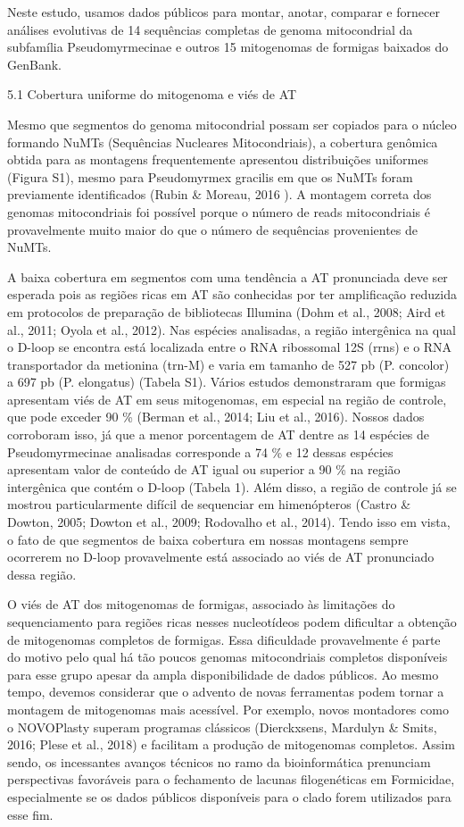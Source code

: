 \documentclass[../DISSERTACAO_MAIN.tex]{subfiles}
\begin{document}
	
	Neste estudo, usamos dados públicos para montar, anotar, comparar e fornecer análises evolutivas de 14 sequências completas de genoma mitocondrial da subfamília Pseudomyrmecinae e outros 15 mitogenomas de formigas baixados do GenBank.
	
	5.1 Cobertura uniforme do mitogenoma e viés de AT
	
	Mesmo que segmentos do genoma mitocondrial possam ser copiados para o núcleo formando NuMTs (Sequências Nucleares Mitocondriais), a cobertura genômica obtida para as montagens frequentemente apresentou distribuições uniformes (Figura S1), mesmo para Pseudomyrmex gracilis em que os NuMTs foram previamente identificados (Rubin \& Moreau, 2016 ). A montagem correta dos genomas mitocondriais foi possível porque o número de reads mitocondriais é provavelmente muito maior do que o número de sequências provenientes de NuMTs.
	
	A baixa cobertura em segmentos com uma tendência a AT pronunciada deve ser esperada pois as regiões ricas em AT são conhecidas por ter amplificação reduzida em protocolos de preparação de bibliotecas Illumina (Dohm et al., 2008; Aird et al., 2011; Oyola et al., 2012). Nas espécies analisadas, a região intergênica na qual o D-loop se encontra está localizada entre o RNA ribossomal 12S (rrns) e o RNA transportador da metionina (trn-M) e varia em tamanho de 527 pb (P. concolor) a 697 pb (P. elongatus) (Tabela S1). Vários estudos demonstraram que formigas apresentam viés de AT em seus mitogenomas, em especial na região de controle, que pode exceder 90 \% (Berman et al., 2014; Liu et al., 2016). Nossos dados corroboram isso, já que a menor porcentagem de AT dentre as 14 espécies de Pseudomyrmecinae analisadas corresponde a 74 \% e 12 dessas espécies apresentam valor de conteúdo de AT igual ou superior a 90 \% na região intergênica que contém o D-loop (Tabela 1). Além disso, a região de controle já se mostrou particularmente difícil de sequenciar em himenópteros (Castro \& Dowton, 2005; Dowton et al., 2009; Rodovalho et al., 2014). Tendo isso em vista, o fato de que segmentos de baixa cobertura em nossas montagens sempre ocorrerem no D-loop provavelmente está associado ao viés de AT pronunciado dessa região.
	
	O viés de AT dos mitogenomas de formigas, associado às limitações do sequenciamento para regiões ricas nesses nucleotídeos podem dificultar a obtenção de mitogenomas completos de formigas. Essa dificuldade provavelmente é parte do motivo pelo qual há tão poucos genomas mitocondriais completos disponíveis para esse grupo apesar da ampla disponibilidade de dados públicos. Ao mesmo tempo, devemos considerar que o advento de novas ferramentas podem tornar a montagem de mitogenomas mais acessível. Por exemplo, novos montadores como o NOVOPlasty superam programas clássicos (Dierckxsens, Mardulyn \& Smits, 2016; Plese et al., 2018) e facilitam a produção de mitogenomas completos. Assim sendo, os incessantes avanços técnicos no ramo da bioinformática prenunciam perspectivas favoráveis para o fechamento de lacunas filogenéticas em Formicidae, especialmente se os dados públicos disponíveis para o clado forem utilizados para esse fim.
	
\end{document}
